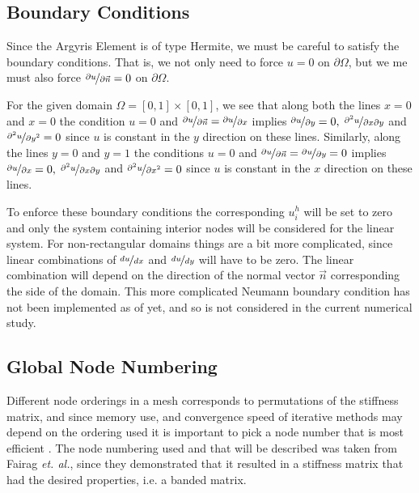 \subsection{Boundary Conditions}
Since the Argyris Element is of type Hermite, we must be careful to satisfy the
boundary conditions. That is, we not only need to force $u=0$ on $\partial
\Omega$, but we me must also force $\nicefrac{\partial u}{\partial
\vec{n}} = 0$ on $\partial \Omega$. 

For the given domain $\Omega=[0,1]\times[0,1]$, we see that along both the lines
$x=0$ and $x=0$ the condition $u=0$ and $\nicefrac{\partial u}{\partial
\vec{n}} = \nicefrac{\partial u}{\partial x}$ implies $\nicefrac{\partial
u}{\partial y} = 0,\; \nicefrac{\partial^2 u}{\partial x \partial y}$ and 
$\nicefrac{\partial^2 u}{\partial y^2}=0$ since $u$ is constant in the $y$
direction on these lines.  Similarly, along the lines $y=0$ and
$y=1$ the conditions $u=0$ and $\nicefrac{\partial u}{\partial \vec{n}} =
\nicefrac{\partial u}{\partial y} = 0$ implies $\nicefrac{\partial
u}{\partial x} = 0,\; \nicefrac{\partial^2 u}{\partial x \partial y}$ and
$\nicefrac{\partial^2 u}{\partial x^2}=0$ since $u$ is constant in the $x$
direction on these lines.

To enforce these boundary conditions the corresponding $u^h_i$ will be set to
zero and only the system containing interior nodes will be considered for the
linear system. For non-rectangular domains things are a bit more complicated,
since linear combinations of $\nicefrac{du}{dx}$ and $\nicefrac{du}{dy}$ will
have to be zero. The linear combination will depend on the direction of the
normal vector $\vec{n}$ corresponding the side of the domain. This more
complicated Neumann boundary condition has not been implemented as of yet, and
so is not considered in the current numerical study.

\subsection{Global Node Numbering}
Different node orderings in a mesh corresponds to permutations of the stiffness
matrix, and since memory use, and convergence speed of iterative methods may
depend on the ordering used it is important to pick a node number that is most
efficient \cite{Fairag}. The node numbering used and that will be
described was taken from Fairag \emph{et. al.}, since they demonstrated that it
resulted in a stiffness matrix that had the desired properties, i.e. a banded
matrix.

